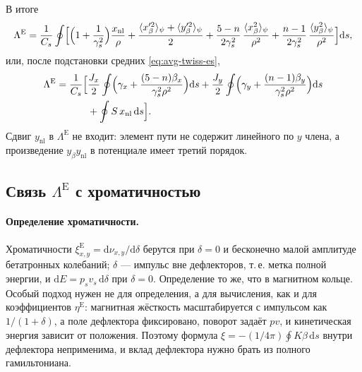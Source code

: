 В итоге
\begin{equation}
\label{eq:Lambda-es}
\Lambda^{\mathrm{E}}
=\frac{1}{C_s}\oint\Bigl[
\Bigl(1+\frac{1}{\gamma_s^2}\Bigr)\frac{x_{\mathrm{nl}}}{\rho}
+\frac{\langle x_\beta'^2\rangle_\psi+\langle y_\beta'^2\rangle_\psi}{2}
+\frac{5-n}{2\gamma_s^2}\,\frac{\langle x_\beta^2\rangle_\psi}{\rho^2}
+\frac{n-1}{2\gamma_s^2}\,\frac{\langle y_\beta^2\rangle_\psi}{\rho^2}
\Bigr]\mathrm{d}s,
\end{equation}
или, после подстановки средних \eqref{eq:avg-twiss-es},
\begin{equation}
\label{eq:Lambda-es-J}
\begin{aligned}
\Lambda^{\mathrm{E}}
=\frac{1}{C_s}\Bigl[&
\frac{J_x}{2}\oint\Bigl(
\gamma_x+\frac{(5-n)\beta_x}{\gamma_s^2\rho^2}
\Bigr)\mathrm{d}s
+\frac{J_y}{2}\oint\Bigl(
\gamma_y+\frac{(n-1)\beta_y}{\gamma_s^2\rho^2}
\Bigr)\mathrm{d}s\\
&+\oint S\,x_{\mathrm{nl}}\,\mathrm{d}s
\Bigr].
\end{aligned}
\end{equation}
Сдвиг $y_{\mathrm{nl}}$ в $\Lambda^{\mathrm{E}}$ не входит: элемент пути не содержит линейного по $y$ члена, а произведение $y_\beta y_{\mathrm{nl}}$ в потенциале имеет третий порядок.

\subsection{Связь $\Lambda^{\mathrm{E}}$ с хроматичностью}

\paragraph{Определение хроматичности.}
Хроматичности $\xi_{x,y}^{\mathrm{E}}=\mathrm{d}\nu_{x,y}/\mathrm{d}\delta$ берутся при $\delta=0$ и бесконечно малой амплитуде бетатронных колебаний; $\delta$ --- импульс вне дефлекторов, т.\,е. метка полной энергии, и $\mathrm{d}E=p_sv_s\,\mathrm{d}\delta$ при $\delta=0$. Определение то же, что в магнитном кольце. Особый подход нужен не для определения, а для вычисления, как и для коэффициентов $\eta^{\mathrm{E}}$: магнитная жёсткость масштабируется с импульсом как $1/(1+\delta)$, а поле дефлектора фиксировано, поворот задаёт $pv$, и кинетическая энергия зависит от положения. Поэтому формула $\xi=-(1/4\pi)\oint K\beta\,\mathrm{d}s$ внутри дефлектора неприменима, и вклад дефлектора нужно брать из полного гамильтониана.

